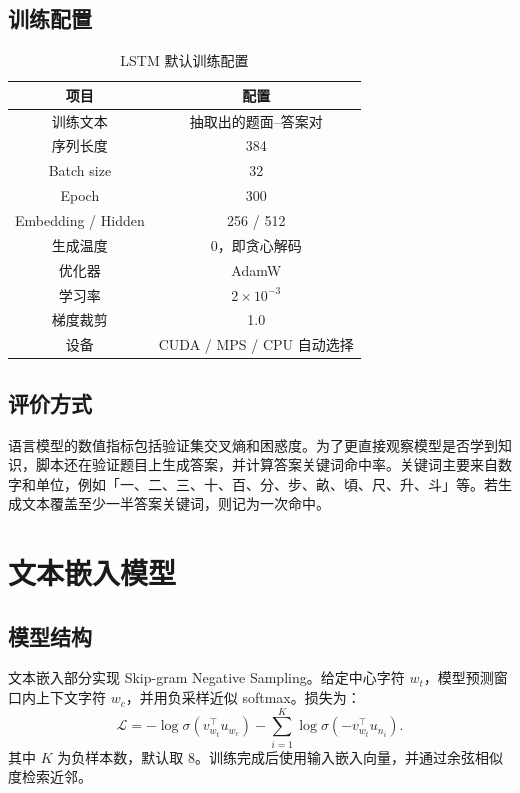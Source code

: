 \documentclass[a4paper,10pt,twocolumn]{article}
\begin{document}
\subsection{训练配置}
\begin{table}[H]
\centering
\small
\caption{LSTM 默认训练配置}
\begin{tabular}{c|c}
\toprule
项目 & 配置 \\
\midrule
训练文本 & 抽取出的题面--答案对 \\
序列长度 & 384 \\
Batch size & 32 \\
Epoch & 300 \\
Embedding / Hidden & 256 / 512 \\
生成温度 & 0，即贪心解码 \\
优化器 & AdamW \\
学习率 & $2\times10^{-3}$ \\
梯度裁剪 & 1.0 \\
设备 & CUDA / MPS / CPU 自动选择 \\
\bottomrule
\end{tabular}
\end{table}

\subsection{评价方式}
语言模型的数值指标包括验证集交叉熵和困惑度。为了更直接观察模型是否学到知识，脚本还在验证题目上生成答案，并计算答案关键词命中率。关键词主要来自数字和单位，例如「一、二、三、十、百、分、步、畝、頃、尺、升、斗」等。若生成文本覆盖至少一半答案关键词，则记为一次命中。

\section{文本嵌入模型}
\subsection{模型结构}
文本嵌入部分实现 Skip-gram Negative Sampling。给定中心字符 $w_t$，模型预测窗口内上下文字符 $w_c$，并用负采样近似 softmax。损失为：
\[
\mathcal{L}= -\log \sigma(v_{w_t}^{\top}u_{w_c})
-\sum_{i=1}^{K}\log \sigma(-v_{w_t}^{\top}u_{n_i}).
\]
其中 $K$ 为负样本数，默认取 8。训练完成后使用输入嵌入向量，并通过余弦相似度检索近邻。
\end{document}
